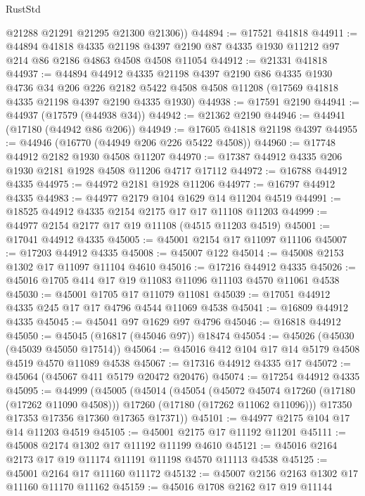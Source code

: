 \begin{lexlean}{RustStd}
\begin{coremodule}
        @21288
        @21291
        @21295
        @21300
        @21306))
@44894 := @17521 @41818
@44911 := @44894
    @41818
    @4335
    @21198
    @4397
    @2190
    @87
    @4335
    @1930
    @11212
    @97
    @214
    @86
    @2186
    @4863
    @4508
    @4508
    @11054
@44912 := @21331 @41818
@44937 := @44894
    @44912
    @4335
    @21198
    @4397
    @2190
    @86
    @4335
    @1930
    @4736
    @34
    @206
    @226
    @2182
    @5422
    @4508
    @4508
    @11208
    (@17569 @41818 @4335 @21198 @4397 @2190 @4335 @1930)
@44938 := @17591 @2190
@44941 := @44937 (@17579 (@44938 @34))
@44942 := @21362 @2190
@44946 := @44941 (@17180 (@44942 @86 @206))
@44949 := @17605 @41818 @21198 @4397
@44955 := @44946 (@16770 (@44949 @206 @226 @5422 @4508))
@44960 := @17748 @44912 @2182 @1930 @4508 @11207
@44970 := @17387 @44912 @4335 @206 @1930 @2181 @1928 @4508 @11206 @4717 @17112
@44972 := @16788 @44912 @4335
@44975 := @44972 @2181 @1928 @11206
@44977 := @16797 @44912 @4335
@44983 := @44977 @2179 @104 @1629 @14 @11204 @4519
@44991 := @18525 @44912 @4335 @2154 @2175 @17 @17 @11108 @11203
@44999 := @44977 @2154 @2177 @17 @19 @11108 (@4515 @11203 @4519)
@45001 := @17041 @44912 @4335
@45005 := @45001 @2154 @17 @11097 @11106
@45007 := @17203 @44912 @4335
@45008 := @45007 @122
@45014 := @45008 @2153 @1302 @17 @11097 @11104 @4610
@45016 := @17216 @44912 @4335
@45026 := @45016 @1705 @414 @17 @19 @11083 @11096 @11103 @4570 @11061 @4538
@45030 := @45001 @1705 @17 @11079 @11081
@45039 := @17051 @44912 @4335 @245 @17 @17 @4796 @4544 @11069 @4538
@45041 := @16809 @44912 @4335
@45045 := @45041 @97 @1629 @97 @4796
@45046 := @16818 @44912
@45050 := @45045 (@16817 (@45046 @97)) @18474
@45054 := @45026 (@45030 (@45039 @45050 @17514))
@45064 := @45016 @412 @104 @17 @14 @5179 @4508 @4519 @4570 @11089 @4538
@45067 := @17316 @44912 @4335 @17
@45072 := @45064 (@45067 @411 @5179 @20472 @20476)
@45074 := @17254 @44912 @4335
@45095 := @44999
    (@45005
      (@45014
        (@45054
          (@45072 @45074 @17260 (@17180 (@17262 @11090 @4508)))
          @17260
          (@17180 (@17262 @11062 @11096)))
        @17350
        @17353
        @17356
        @17360
        @17365
        @17371))
@45101 := @44977 @2175 @104 @17 @14 @11203 @4519
@45105 := @45001 @2175 @17 @11192 @11201
@45111 := @45008 @2174 @1302 @17 @11192 @11199 @4610
@45121 := @45016 @2164 @2173 @17 @19 @11174 @11191 @11198 @4570 @11113 @4538
@45125 := @45001 @2164 @17 @11160 @11172
@45132 := @45007 @2156 @2163 @1302 @17 @11160 @11170 @11162
@45159 := @45016
    @1708
    @2162
    @17
    @19
    @11144

\end{coremodule}
\end{lexlean}
